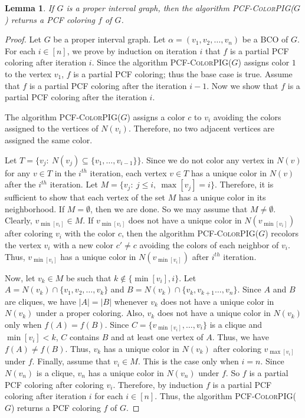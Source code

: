 \documentclass[11pt]{article}
\theoremstyle{plain}
\newtheorem{lemma}{Lemma}
\begin{document}
\begin{lemma}\label{special-pig_optimal}
	If $G$ is a proper interval graph, then the algorithm \textsc{PCF-ColorPIG}($G$) returns a PCF coloring $f$ of $G$. 
\end{lemma}
\begin{proof}
	Let $G$ be a proper interval graph. Let $\alpha = (v_1, v_2, \ldots, v_n)$ be a BCO of $G$. For each $i\in [n]$, we prove by induction on iteration $i$ that $f$ is a partial PCF coloring after iteration $i$. Since the algorithm \textsc{PCF-ColorPIG}($G$) assigns color $1$ to the vertex $v_1$,  $f$ is a partial PCF coloring; thus the base case is true. Assume that 
	$f$ is a partial PCF coloring after the iteration $i-1$. 
	Now we show that $f$ is a partial PCF coloring after the iteration $i$.
	
	\medskip
	
	The algorithm \textsc{PCF-ColorPIG}($G$) assigns a color $c$ to $v_i$ avoiding the colors assigned to the vertices of $N(v_i)$. Therefore, no two adjacent vertices are assigned the same color.
	
	\medskip
	
	Let $T = \{v_j:~ N(v_j)\subseteq \{v_1, \ldots, v_{i-1}\}\}$. Since we do not color any vertex in $N(v)$ for any $v\in T$ in the $i^{th}$ iteration, each vertex $v\in T$ has a unique color in $N(v)$ after the $i^{th}$ iteration. Let $M = \{v_j : ~j\leq i, ~\max[v_j]=i\}$. 
	Therefore, it is sufficient to show that each vertex of the set $M$ has a unique color in its neighborhood. If $M = \emptyset$, then we are done. So we may assume that $M \neq \emptyset$. Clearly, $v_{\min[v_i]}\in M$. If $v_{\min[v_i]}$ does not have a unique color in $N(v_{\min[v_i]})$ after coloring $v_i$ with the color $c$, then the algorithm \textsc{PCF-ColorPIG}($G$) recolors the vertex $v_i$ with a new color $c'\neq c$ avoiding the colors of each neighbor of $v_i$. Thus, $v_{\min[v_i]}$ has a unique color in $N(v_{\min[v_i]})$ after $i^{th}$ iteration.
	
	\medskip
	
	Now, let $v_k \in M$ be such that $k\notin \{\min[v_i], i\}$. Let $A = N(v_k)\cap\{v_1, v_2, \ldots, v_k\}$ and $B = N(v_k)\cap\{v_k, v_{k+1} \ldots, v_n\}$. Since $A$ and $B$ are cliques, we have $|A| = |B|$ whenever $v_k$ does not have a unique color in $N(v_k)$ under a proper coloring. Also, $v_k$ does not have a unique color in $N(v_k)$ only when $f(A) = f(B)$. Since $C = \{v_{\min[v_i]}, \ldots, v_i\}$ is a clique and $\min[v_i]< k$, $C$ contains $B$ and at least one vertex of $A$. Thus, we have $f(A) \neq f(B)$. 
	Thus, $v_k$ has a unique color in $N(v_k)$ after coloring $v_{\max[v_i]}$ under $f$. 
	Finally, assume that $v_i\in M$. This is the case only when $i=n$.
	Since $N(v_n)$ is a clique, $v_n$ has a unique color in $N(v_n)$ under $f$.  
	So $f$ is a partial PCF coloring after coloring $v_i$.
	Therefore, by induction $f$ is a partial PCF coloring after iteration $i$ for each $i\in [n]$. Thus, 
	the algorithm \textsc{PCF-ColorPIG}($G$) returns a PCF coloring $f$ of $G$.
\end{proof}
\end{document}
